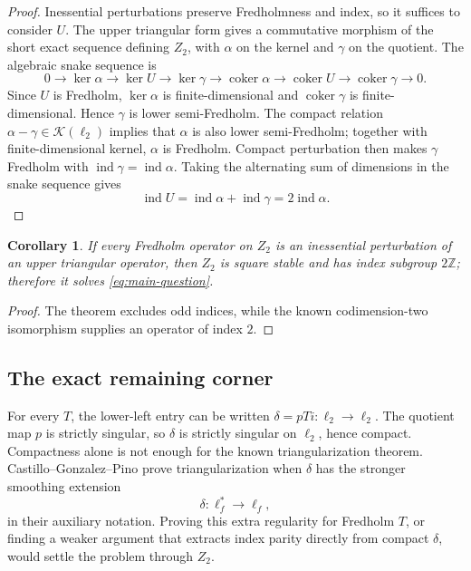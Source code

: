 \documentclass[11pt]{article}
\newtheorem{corollary}[theorem]{Corollary}
\theoremstyle{definition}
\theoremstyle{remark}
\newcommand{\Z}{\mathbb Z}
\newcommand{\K}{\mathcal K}
\newcommand{\ind}{\operatorname{ind}}
\begin{document}
\begin{proof}
Inessential perturbations preserve Fredholmness and index, so it suffices to
consider $U$.  The upper triangular form gives a commutative morphism of the
short exact sequence defining $Z_2$, with $\alpha$ on the kernel and $\gamma$
on the quotient.  The algebraic snake sequence is
\[
0\to\ker\alpha\to\ker U\to\ker\gamma\to
\operatorname{coker}\alpha\to\operatorname{coker}U\to
\operatorname{coker}\gamma\to0.
\]
Since $U$ is Fredholm, $\ker\alpha$ is finite-dimensional and
$\operatorname{coker}\gamma$ is finite-dimensional.  Hence $\gamma$ is lower
semi-Fredholm.  The compact relation $\alpha-\gamma\in\K(\ell_2)$ implies that
$\alpha$ is also lower semi-Fredholm; together with finite-dimensional kernel,
$\alpha$ is Fredholm.  Compact perturbation then makes $\gamma$ Fredholm with
$\ind\gamma=\ind\alpha$.  Taking the alternating sum of dimensions in the
snake sequence gives
\[
 \ind U=\ind\alpha+\ind\gamma=2\ind\alpha.
\]
\end{proof}

\begin{corollary}\label{cor:z2-solve}
If every Fredholm operator on $Z_2$ is an inessential perturbation of an upper
triangular operator, then $Z_2$ is square stable and has index subgroup $2\Z$;
therefore it solves \eqref{eq:main-question}.
\end{corollary}

\begin{proof}
The theorem excludes odd indices, while the known codimension-two isomorphism
supplies an operator of index $2$.
\end{proof}

\subsection{The exact remaining corner}

For every $T$, the lower-left entry can be written $\delta=pTi:\ell_2\to\ell_2$.
The quotient map $p$ is strictly singular, so $\delta$ is strictly singular on
$\ell_2$, hence compact.  Compactness alone is not enough for the known
triangularization theorem.  Castillo--Gonzalez--Pino prove triangularization
when $\delta$ has the stronger smoothing extension
\[
 \delta:\ell_f^*\longrightarrow\ell_f,
\]
in their auxiliary notation.  Proving this extra regularity for Fredholm $T$,
or finding a weaker argument that extracts index parity directly from compact
$\delta$, would settle the problem through $Z_2$.
\end{document}
